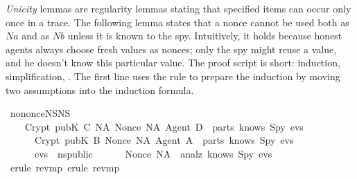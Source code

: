\begin{isabellebody}
\begin{isamarkuptext}
\emph{Unicity} lemmas are regularity lemmas stating that specified items
can occur only once in a trace.  The following lemma states that a nonce
cannot be used both as $Na$ and as $Nb$ unless
it is known to the spy.  Intuitively, it holds because honest agents
always choose fresh values as nonces; only the spy might reuse a value,
and he doesn't know this particular value.  The proof script is short:
induction, simplification, .  The first line uses the rule
 to prepare the induction by moving two assumptions into the 
induction formula.%
\end{isamarkuptext}%
\isamarkuptrue%
\isamarkupfalse%
\ no{}nonce{}NS{}{}NS{}{}\isanewline
\ \ \ \ {}{}Crypt\ {}pubK\ C{}\ {}NA{}{}\ Nonce\ NA{}\ Agent\ D{}\ {}\ parts\ {}knows\ Spy\ evs{}{}\isanewline
\ \ \ \ \ \ Crypt\ {}pubK\ B{}\ {}Nonce\ NA{}\ Agent\ A{}\ {}\ parts\ {}knows\ Spy\ evs{}{}\isanewline
\ \ \ \ \ \ evs\ {}\ ns{}public{}\isanewline
\ \ \ \ \ {}\ Nonce\ NA\ {}\ analz\ {}knows\ Spy\ evs{}{}\isanewline
%
\isadelimproof
%
\endisadelimproof
%
\isatagproof
{}\isamarkupfalse%
\ {}erule\ rev{}mp{}\ erule\ rev{}mp{}\isanewline

\end{isabellebody}
